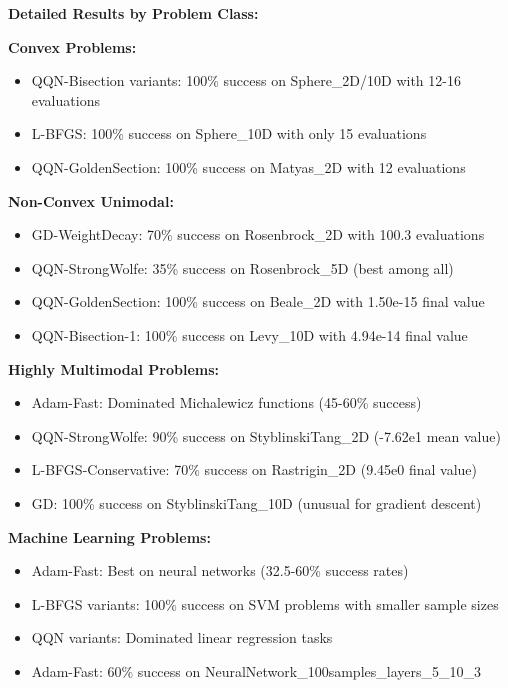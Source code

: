 \textbf{Detailed Results by Problem Class:}

\textbf{Convex Problems:}

\begin{itemize}
\tightlist
\item
  QQN-Bisection variants: 100\% success on Sphere\_2D/10D with 12-16 evaluations
\item
  L-BFGS: 100\% success on Sphere\_10D with only 15 evaluations
\item
  QQN-GoldenSection: 100\% success on Matyas\_2D with 12 evaluations
\end{itemize}

\textbf{Non-Convex Unimodal:}

\begin{itemize}
\tightlist
\item
  GD-WeightDecay: 70\% success on Rosenbrock\_2D with 100.3 evaluations
\item
  QQN-StrongWolfe: 35\% success on Rosenbrock\_5D (best among all)
\item
  QQN-GoldenSection: 100\% success on Beale\_2D with 1.50e-15 final value
\item
  QQN-Bisection-1: 100\% success on Levy\_10D with 4.94e-14 final value
\end{itemize}

\textbf{Highly Multimodal Problems:}

\begin{itemize}
\tightlist
\item
  Adam-Fast: Dominated Michalewicz functions (45-60\% success)
\item
  QQN-StrongWolfe: 90\% success on StyblinskiTang\_2D (-7.62e1 mean value)
\item
  L-BFGS-Conservative: 70\% success on Rastrigin\_2D (9.45e0 final value)
\item
  GD: 100\% success on StyblinskiTang\_10D (unusual for gradient descent)
\end{itemize}

\textbf{Machine Learning Problems:}

\begin{itemize}
\tightlist
\item
  Adam-Fast: Best on neural networks (32.5-60\% success rates)
\item
  L-BFGS variants: 100\% success on SVM problems with smaller sample sizes
\item
  QQN variants: Dominated linear regression tasks
\item
  Adam-Fast: 60\% success on NeuralNetwork\_100samples\_layers\_5\_10\_3
\end{itemize}

